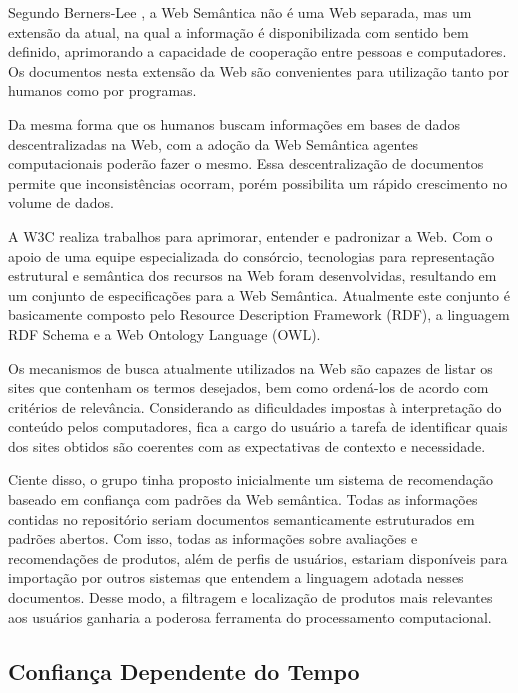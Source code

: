  Segundo Berners-Lee \cite{bemerslee2001sw}, a Web Semântica não é uma Web separada, mas um extensão da atual, na qual a informação é disponibilizada com sentido bem definido, aprimorando a capacidade de cooperação entre pessoas e computadores. Os documentos nesta extensão da Web são convenientes para utilização tanto por humanos como por programas.

 Da mesma forma que os humanos buscam informações em bases de dados descentralizadas na Web, com a adoção da Web Semântica agentes computacionais poderão fazer o mesmo. Essa descentralização de documentos permite que inconsistências ocorram, porém possibilita um rápido crescimento no volume de dados.

 A W3C realiza trabalhos para aprimorar, entender e padronizar a Web. Com o apoio de uma equipe especializada do consórcio, tecnologias para representação estrutural e semântica dos recursos na Web foram desenvolvidas, resultando em um conjunto de especificações para a Web Semântica. Atualmente este conjunto é basicamente composto pelo Resource Description Framework (RDF), a linguagem RDF Schema e a Web Ontology Language (OWL).

 Os mecanismos de busca atualmente utilizados na Web são capazes de listar os sites que contenham os termos desejados, bem como ordená-los de acordo com critérios de relevância. Considerando as dificuldades impostas à interpretação do conteúdo pelos computadores, fica a cargo do usuário a tarefa de identificar quais dos sites obtidos são coerentes com as expectativas de contexto e necessidade.

 Ciente disso, o grupo tinha proposto inicialmente um sistema de recomendação baseado em confiança com padrões da Web semântica. Todas as informações contidas no repositório seriam documentos semanticamente estruturados em padrões abertos. Com isso, todas as informações sobre avaliações e recomendações de produtos, além de perfis de usuários, estariam disponíveis para importação por outros sistemas que entendem a linguagem adotada nesses documentos. Desse modo, a filtragem e localização de produtos mais relevantes aos usuários ganharia a poderosa ferramenta do processamento computacional.


\subsection{Confiança Dependente do Tempo} %
\label{sub:confianca_dependente_do_tempo}

